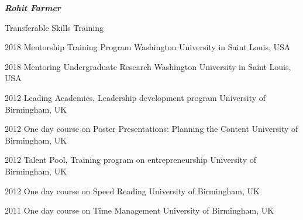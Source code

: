 \documentclass[10pt]{article}
\begin{document}
\begin{cv}{\huge \it \bfseries Rohit Farmer}
\vskip3pt
\begin{cvlist}{Transferable Skills Training}
	\item[2018] Mentorship Training Program \hfill Washington University in Saint Louis, USA
	\item[2018] Mentoring Undergraduate Research \hfill Washington University in Saint Louis, USA
	\item[2012] Leading Academics, Leadership development program \hfill University of Birmingham, UK
	\item[2012] One day course on Poster Presentations: Planning the Content \hfill University of Birmingham, UK
	\item[2012] Talent Pool, Training program on entrepreneurship \hfill University of Birmingham, UK
	\item[2012] One day course on Speed Reading \hfill University of Birmingham, UK
	\item[2011] One day course on Time Management \hfill University of Birmingham, UK
\end{cvlist}


\end{cv}
\end{document}
